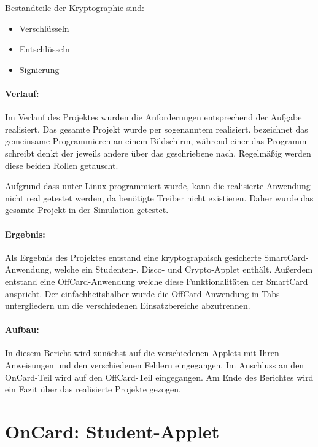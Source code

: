Bestandteile der Kryptographie sind:
\begin{itemize}
	\item Verschlüsseln
	\item Entschlüsseln
	\item Signierung
\end{itemize}

\paragraph{Verlauf:}
Im Verlauf des Projektes wurden die Anforderungen entsprechend der Aufgabe realisiert.
Das gesamte Projekt wurde per sogenanntem  realisiert.
 bezeichnet das gemeinsame Programmieren an einem Bildschirm, während einer das Programm schreibt denkt der jeweils andere über das geschriebene nach.
Regelmäßig werden diese beiden Rollen getauscht.

Aufgrund dass unter Linux programmiert wurde, kann die realisierte Anwendung nicht real getestet werden, da benötigte Treiber nicht existieren.
Daher wurde das gesamte Projekt in der Simulation getestet.

\paragraph{Ergebnis:}
Als Ergebnis des Projektes entstand eine kryptographisch gesicherte SmartCard-Anwendung, welche ein Studenten-, Disco- und Crypto-Applet enthält.
Außerdem entstand eine OffCard-Anwendung welche diese Funktionalitäten der SmartCard anspricht.
Der einfachheitshalber wurde die OffCard-Anwendung in Tabs untergliedern um die verschiedenen Einsatzbereiche abzutrennen.

\paragraph{Aufbau:}
In diesem Bericht wird zunächst auf die verschiedenen Applets mit Ihren Anweisungen und den verschiedenen Fehlern eingegangen.
Im Anschluss an den OnCard-Teil wird auf den OffCard-Teil eingegangen.
Am Ende des Berichtes wird ein Fazit über das realisierte Projekte gezogen.


\section{OnCard: Student-Applet}



